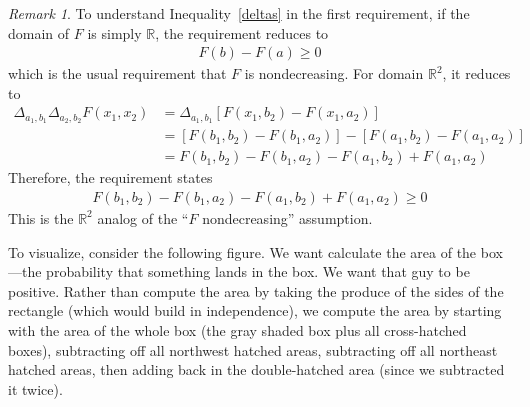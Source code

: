 \documentclass[12pt]{article}
\theoremstyle{plain}
\theoremstyle{definition}
\theoremstyle{remark}
\newtheorem*{rmk}{Remark}
\newcommand{\R}{\mathbb{R}}
\begin{document}
\begin{rmk}
To understand Inequality~\ref{deltas} in the first requirement, if the
domain of $F$ is simply $\R$, the requirement reduces to
\begin{align*}
  F(b) - F(a) \geq 0
\end{align*}
which is the usual requirement that $F$ is nondecreasing. For domain
$\R^2$, it reduces to
\begin{align*}
  \Delta_{a_1,b_1}
  \Delta_{a_2,b_2}
  F(x_1,x_2)
  &=
  \Delta_{a_1,b_1}
  \left[F(x_1,b_2)-F(x_1,a_2)\right] \\
  &=
  \left[F(b_1,b_2)-F(b_1,a_2)\right]
  -
  \left[F(a_1,b_2)-F(a_1,a_2)\right] \\
  &=
  F(b_1,b_2)-F(b_1,a_2)
  - F(a_1,b_2)+F(a_1,a_2)
\end{align*}
Therefore, the requirement states
\begin{align*}
  F(b_1,b_2)-F(b_1,a_2)
  - F(a_1,b_2)+F(a_1,a_2)
  \geq 0
\end{align*}
This is the $\R^2$ analog of the ``$F$ nondecreasing'' assumption.

To visualize, consider the following figure. We want calculate the
area of the box---the probability that something lands in the box. We
want that guy to be positive. Rather than compute the area by taking the
produce of the sides of the rectangle (which would build in
independence), we compute the area by starting with the area of the
whole box (the gray shaded box plus all cross-hatched boxes),
subtracting off all northwest hatched areas, subtracting off all
northeast hatched areas, then adding back in the double-hatched area
(since we subtracted it twice).
\begin{figure}[htpb!]
\centering
{}
\end{figure}
\end{rmk}
\end{document}
